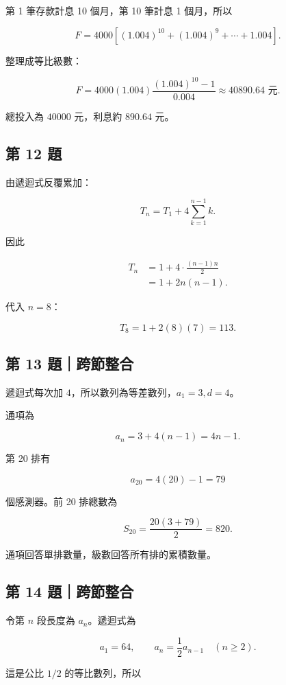 \documentclass[11pt,a4paper]{article}
\begin{document}
第 1 筆存款計息 10 個月，第 10 筆計息 1 個月，所以

\[
F=4000[(1.004)^{10}+(1.004)^9+\cdots+1.004].
\]

整理成等比級數：

\[
F=4000(1.004)\frac{(1.004)^{10}-1}{0.004}
\approx40890.64\text{ 元}.
\]

總投入為 \(40000\) 元，利息約 \(890.64\) 元。

\subsection{第 12 題}\label{ux7b2c-12-ux984c}

由遞迴式反覆累加：

\[
T_n=T_1+4\sum_{k=1}^{n-1}k.
\]

因此

\[
\begin{aligned}
T_n
&=1+4\cdot\frac{(n-1)n}{2}\\
&=1+2n(n-1).
\end{aligned}
\]

代入 \(n=8\)：

\[
T_8=1+2(8)(7)=113.
\]

\subsection{第 13 題｜跨節整合}\label{ux7b2c-13-ux984cux8de8ux7bc0ux6574ux5408}

遞迴式每次加 \(4\)，所以數列為等差數列，\(a_1=3,d=4\)。

通項為

\[
a_n=3+4(n-1)=4n-1.
\]

第 20 排有

\[
a_{20}=4(20)-1=79
\]

個感測器。前 20 排總數為

\[
S_{20}=\frac{20(3+79)}2=820.
\]

通項回答單排數量，級數回答所有排的累積數量。

\subsection{第 14 題｜跨節整合}\label{ux7b2c-14-ux984cux8de8ux7bc0ux6574ux5408}

令第 \(n\) 段長度為 \(a_n\)。遞迴式為

\[
a_1=64,\qquad a_n=\frac12a_{n-1}\quad(n\ge2).
\]

這是公比 \(1/2\) 的等比數列，所以
\end{document}
